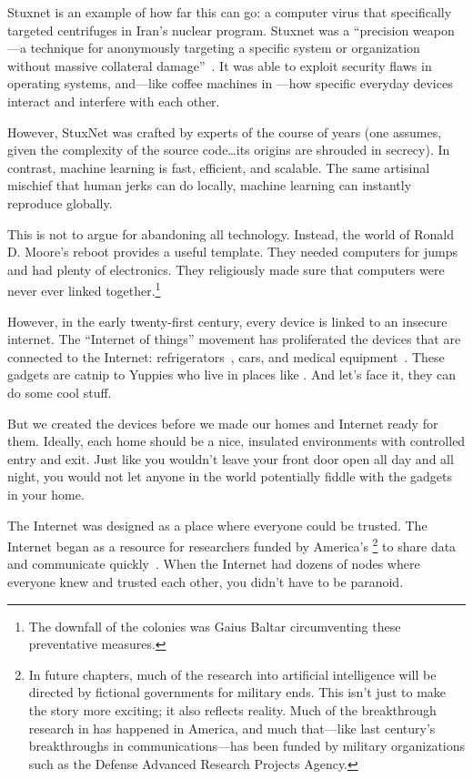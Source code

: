 Stuxnet is an example of how far this can go: a computer virus that
specifically targeted centrifuges in Iran's nuclear program.
%
Stuxnet was a ``precision weapon---a technique for anonymously
targeting a specific system or organization without massive collateral
damage''~\citep{lachow-11}.
%
It was able to exploit security flaws in operating systems, and---like
coffee machines in \crunchyCity{}---how specific everyday devices
interact and interfere with each other.

However, StuxNet was crafted by experts of the course of years (one
assumes, given the complexity of the source code\dots its origins are
shrouded in secrecy).
%
In contrast, machine learning is fast, efficient, and scalable.
%
The same artisinal
mischief that human jerks can do locally, machine learning can
instantly reproduce globally.  

This is not to argue for abandoning all technology.
%
Instead, the world of Ronald D. Moore's 
reboot provides a useful template.
%
They needed computers for jumps and had plenty of electronics.
%
They religiously made sure that computers were never ever linked
together.\footnote{The downfall of the colonies was Gaius Baltar
  circumventing these preventative measures.}


However, in the early twenty-first century, every device is linked to
an insecure internet.
%
The ``Internet of things'' movement has proliferated the devices that
are connected to the Internet: refrigerators~\citep{tanczer-18}, cars,
and medical equipment~\citep{yaqoob-19}.
%
These gadgets are catnip to Yuppies who live in places like
\crunchyCity{}.  And let's face it, they can do some cool stuff.

But we created the devices before we made our homes and Internet ready
for them.
%
Ideally, each home should be a nice, insulated environments
with controlled entry and exit.
%
Just like you wouldn't leave your
front door open all day and all night, you would not let anyone in the
world potentially fiddle with the gadgets in your home.  

The Internet was designed as a place where everyone could be trusted.
The Internet began as a resource for researchers funded by
America's \footnote{In future chapters, much of the
  research into artificial intelligence will be directed by fictional
  governments for military ends.  This isn't just to make the story
  more exciting; it also reflects reality.  Much of the breakthrough
  research in  has happened in America, and much that---like
  last century's breakthroughs in communications---has been funded by
  military organizations such as the Defense Advanced Research
  Projects Agency.} to share data and communicate
quickly~\citep{leiner-09}.
%
When the Internet had dozens of nodes where everyone knew and trusted
each other, you didn't have to be paranoid.

